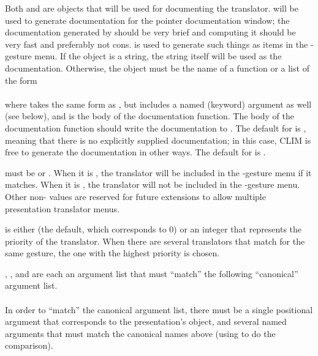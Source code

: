 Both  and  are objects that will
be used for documenting the translator.   will be
used to generate documentation for the pointer documentation window; the
documentation generated by  should be very brief and
computing it should be very fast and preferably not cons.  
is used to generate such things as items in the -gesture menu.  If the
object is a string, the string itself will be used as the documentation.
Otherwise, the object must be the name of a function or a list of the form
\\
\\
where  takes the same form as , but includes a
named (keyword)  argument as well (see below), and 
is the body of the documentation function.  The body of the documentation
function should write the documentation to .  The default for
 is , meaning that there is no explicitly supplied
documentation; in this case, CLIM is free to generate the documentation in
other ways.  The default for  is .

 must be  or .  When it is , the translator will
be included in the -gesture menu if it matches.  When it is ,
the translator will not be included in the -gesture menu.  Other
non- values are reserved for future extensions to allow multiple
presentation translator menus.

 is either  (the default, which corresponds to 0) or an
integer that represents the priority of the translator.  When there are several
translators that match for the same gesture, the one with the highest priority
is chosen.

, , and  are each an argument
list that must ``match'' the following ``canonical'' argument list.
\\
\\
In order to ``match'' the canonical argument list, there must be a single
positional argument that corresponds to the presentation's object, and
several named arguments that must match the canonical names above (using
 to do the comparison).

